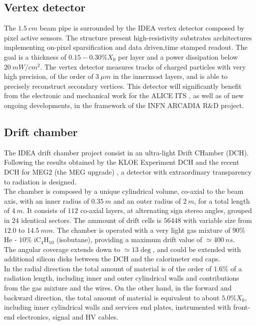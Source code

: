 \subsection{Vertex detector}
The $1.5\ cm$ beam pipe is surrounded by the IDEA vertex detector composed by pixel active sensors. The structure present high-resistivity substrates architectures implementing on-pixel sparsification and data driven,time stamped readout.
The goal is a thickness of $0.15-0.30\% X_0$ per layer and a power dissipation below $20\ mW/cm^2$.
The vertex detector measures tracks of charged particles with very high precision, of the order of $3\ \mu m$ in the innermost layers, and is able to precisely reconstruct secondary vertices.
This detector will significantly benefit from the electronic and mechanical work for the ALICE ITS \cite{alice_its}, as well as of new ongoing developments, in the framework of the INFN ARCADIA R\&D project.

\subsection{Drift chamber}
The IDEA drift chamber project consist in an ultra-light Drift CHamber (DCH). Following the results obtained by the KLOE Experiment DCH \cite{KLOE} and the recent DCH for MEG2 (the MEG upgrade) \cite{MEG2}, a detector with extraordinary transparency to radiation is designed.\\

The chamber is composed by a unique cylindrical volume, co-axial to the beam axis, with an inner radius of $0.35\ m$ and an outer radius of $2\ m$, for a total length of $4\ m$. It consists of $112$ co-axial layers, at alternating sign stereo angles, grouped in $24$ identical sectors. The ammount of drift cells is $56448$ with variable size from $12.0$ to $14.5\ mm$.
The chamber is operated with a very light gas mixture of $90\%$ He - $10\%$ iC$_4$H$_{10}$ (isobutane), providing a maximum drift value of $\simeq 400\ ns$.\\
The angular coverage extends down to $\simeq 13\deg$, and could be extended with additional silicon disks between the DCH and the calorimeter end caps.\\
In the radial direction the total amount of material is of the order of $1.6\%$ of a radiation length, including inner and outer cylindrical walls and contributions from the gas mixture and the wires. On the other hand, in the forward and backward direction, the total amount of material is equivalent to about $5.0\% X_0$, including inner cylindrical walls and services end plates, instrumented with front-end electronics, signal and HV cables.\\

